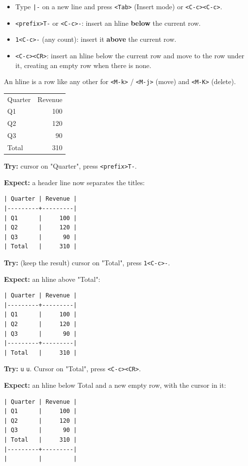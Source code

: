 \begin{itemize}
\item Type \texttt{|-} on a new line and press \texttt{<Tab>} (Insert mode) or \texttt{<C-c><C-c>}.
\item \texttt{<prefix>T-} or \texttt{<C-c>-}: insert an hline \textbf{below} the current row.
\item \texttt{1<C-c>-} (any count): insert it \textbf{above} the current row.
\item \texttt{<C-c><CR>}: insert an hline below the current row and move to the row
under it, creating an empty row when there is none.
\end{itemize}

An hline is a row like any other for \texttt{<M-k>} / \texttt{<M-j>} (move) and \texttt{<M-K>}
(delete).

\begin{table}[htbp]
\label{tab:orgb08c2e4}
\centering
\begin{tabular}{lr}
Quarter & Revenue\\
Q1 & 100\\
Q2 & 120\\
Q3 & 90\\
Total & 310\\
\end{tabular}
\end{table}

\textbf{Try:} cursor on "Quarter", press \texttt{<prefix>T-}.

\textbf{Expect:} a header line now separates the titles:
\begin{verbatim}
| Quarter | Revenue |
|---------+---------|
| Q1      |     100 |
| Q2      |     120 |
| Q3      |      90 |
| Total   |     310 |
\end{verbatim}

\textbf{Try:} (keep the result) cursor on "Total", press \texttt{1<C-c>-}.

\textbf{Expect:} an hline above "Total":
\begin{verbatim}
| Quarter | Revenue |
|---------+---------|
| Q1      |     100 |
| Q2      |     120 |
| Q3      |      90 |
|---------+---------|
| Total   |     310 |
\end{verbatim}

\textbf{Try:} \texttt{u} \texttt{u}. Cursor on "Total", press \texttt{<C-c><CR>}.

\textbf{Expect:} an hline below Total and a new empty row, with the cursor in it:
\begin{verbatim}
| Quarter | Revenue |
| Q1      |     100 |
| Q2      |     120 |
| Q3      |      90 |
| Total   |     310 |
|---------+---------|
|         |         |
\end{verbatim}

